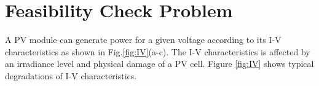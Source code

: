 \documentclass[conference]{IEEEtran}
\begin{document}

\section{Feasibility Check Problem}\label{Sec4}
A PV module can generate power for a given voltage according to its I-V characteristics as shown in Fig.\ref{fig:IV}(a-c). The I-V characteristics is affected by an irradiance level and physical damage of a PV cell. Figure \ref{fig:IV} shows typical degradations of I-V characteristics. 
\end{document}
